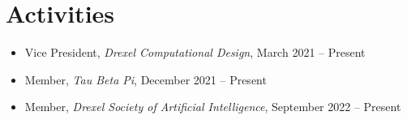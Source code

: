 \documentclass[letterpaper,11pt]{article}
\newcommand{\resumeSubHeadingListStart}{\begin{itemize}[leftmargin=0.0in, label={}]}
\newcommand{\resumeSubHeadingListEnd}{\end{itemize}}
\begin{document}
\section{Activities}
\resumeSubHeadingListStart
    \vspace{-5pt}
    \begin{itemize}[itemsep=-4pt, parsep=4pt]
    
        \item\small {
            Vice President, \emph{Drexel Computational Design}, March 2021 -- Present
        }
        \item\small {
            Member, \emph{Tau Beta Pi}, December 2021 -- Present
        }
        \item\small {
            Member, \emph{Drexel Society of Artificial Intelligence}, September 2022 -- Present
        }
    \end{itemize}
\resumeSubHeadingListEnd
    
\end{document}
